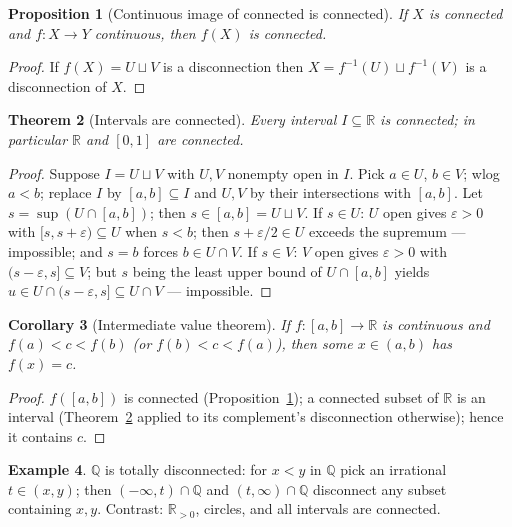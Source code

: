 \documentclass[11pt,a4paper]{article}
\newtheorem{theorem}{Theorem}[section]
\newtheorem{proposition}[theorem]{Proposition}
\newtheorem{corollary}[theorem]{Corollary}
\theoremstyle{definition}
\newtheorem{example}[theorem]{Example}
\newcommand{\R}{\mathbb{R}}
\newcommand{\Q}{\mathbb{Q}}
\begin{document}
	\begin{proposition}[Continuous image of connected is connected]\label{prop:connected-image}
		If $X$ is connected and $f:X\to Y$ continuous, then $f(X)$ is connected.
	\end{proposition}
	\begin{proof}
		If $f(X)=U\sqcup V$ is a disconnection then $X=f^{-1}(U)\sqcup f^{-1}(V)$ is a disconnection of $X$.
	\end{proof}
	
	\begin{theorem}[Intervals are connected]\label{thm:intervals}
		Every interval $I\subseteq\R$ is connected; in particular $\R$ and $[0,1]$ are connected.
	\end{theorem}
	\begin{proof}
		Suppose $I=U\sqcup V$ with $U,V$ nonempty open in $I$. Pick $a\in U$, $b\in V$; wlog $a<b$; replace $I$
		by $[a,b]\subseteq I$ and $U,V$ by their intersections with $[a,b]$. Let $s=\sup(U\cap[a,b])$; then
		$s\in[a,b]=U\sqcup V$. If $s\in U$: $U$ open gives $\varepsilon>0$ with $[s,s+\varepsilon)\subseteq U$ when
		$s<b$; then $s+\varepsilon/2\in U$ exceeds the supremum --- impossible; and $s=b$ forces $b\in U\cap V$.
		If $s\in V$: $V$ open gives $\varepsilon>0$ with $(s-\varepsilon,s]\subseteq V$; but $s$ being the least
		upper bound of $U\cap[a,b]$ yields $u\in U\cap(s-\varepsilon,s]\subseteq U\cap V$ --- impossible.
	\end{proof}
	
	\begin{corollary}[Intermediate value theorem]\label{cor:IVT}
		If $f:[a,b]\to\R$ is continuous and $f(a)<c<f(b)$ (or $f(b)<c<f(a)$), then some $x\in(a,b)$ has $f(x)=c$.
	\end{corollary}
	\begin{proof}
		$f([a,b])$ is connected (Proposition~\ref{prop:connected-image}); a connected subset of $\R$ is an
		interval (Theorem~\ref{thm:intervals} applied to its complement's disconnection otherwise); hence it
		contains $c$.
	\end{proof}
	
	\begin{example}\label{ex:connected}
		$\Q$ is totally disconnected: for $x<y$ in $\Q$ pick an irrational $t\in(x,y)$; then
		$(-\infty,t)\cap\Q$ and $(t,\infty)\cap\Q$ disconnect any subset containing $x,y$. Contrast: $\R_{>0}$,
		circles, and all intervals are connected.
	\end{example}
	
\end{document}
